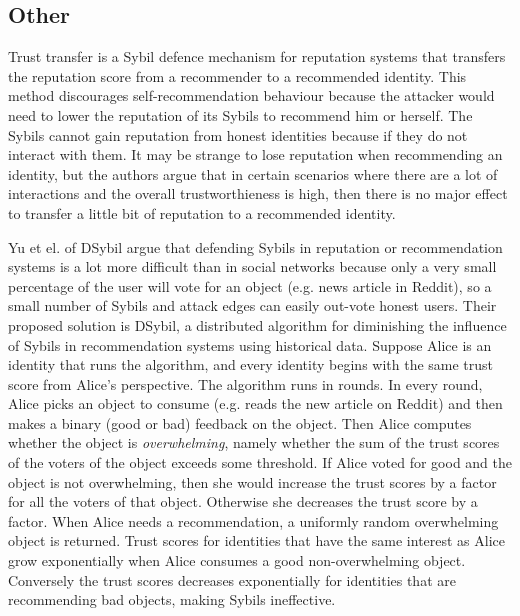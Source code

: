 \subsection{Other}
Trust transfer\cite{seigneur2005trust} is a Sybil defence mechanism for
reputation systems that transfers the reputation score from a recommender to a
recommended identity. This method discourages self-recommendation behaviour
because the attacker would need to lower the reputation of its Sybils to
recommend him or herself. The Sybils cannot gain reputation from honest
identities because if they do not interact with them. It may be strange to lose
reputation when recommending an identity, but the authors argue that in certain
scenarios where there are a lot of interactions and the overall trustworthieness
is high, then there is no major effect to transfer a little bit of reputation to
a recommended identity.

Yu et el. of DSybil\cite{yu2009dsybil} argue that defending Sybils in reputation
or recommendation systems is a lot more difficult than in social networks
because only a very small percentage of the user will vote for an object (e.g.
news article in Reddit), so a small number of Sybils and attack edges can easily
out-vote honest users. Their proposed solution is DSybil, a distributed
algorithm for diminishing the influence of Sybils in recommendation systems
using historical data. Suppose Alice is an identity that runs the algorithm, and
every identity begins with the same trust score from Alice's perspective. The
algorithm runs in rounds. In every round, Alice picks an object to consume (e.g.
reads the new article on Reddit) and then makes a binary (good or bad) feedback
on the object. Then Alice computes whether the object is \emph{overwhelming},
namely whether the sum of the trust scores of the voters of the object exceeds
some threshold. If Alice voted for good and the object is not overwhelming, then
she would increase the trust scores by a factor for all the voters of that
object. Otherwise she decreases the trust score by a factor. When Alice needs a
recommendation, a uniformly random overwhelming object is returned. Trust scores
for identities that have the same interest as Alice grow exponentially when
Alice consumes a good non-overwhelming object. Conversely the trust scores
decreases exponentially for identities that are recommending bad objects, making
Sybils ineffective.

